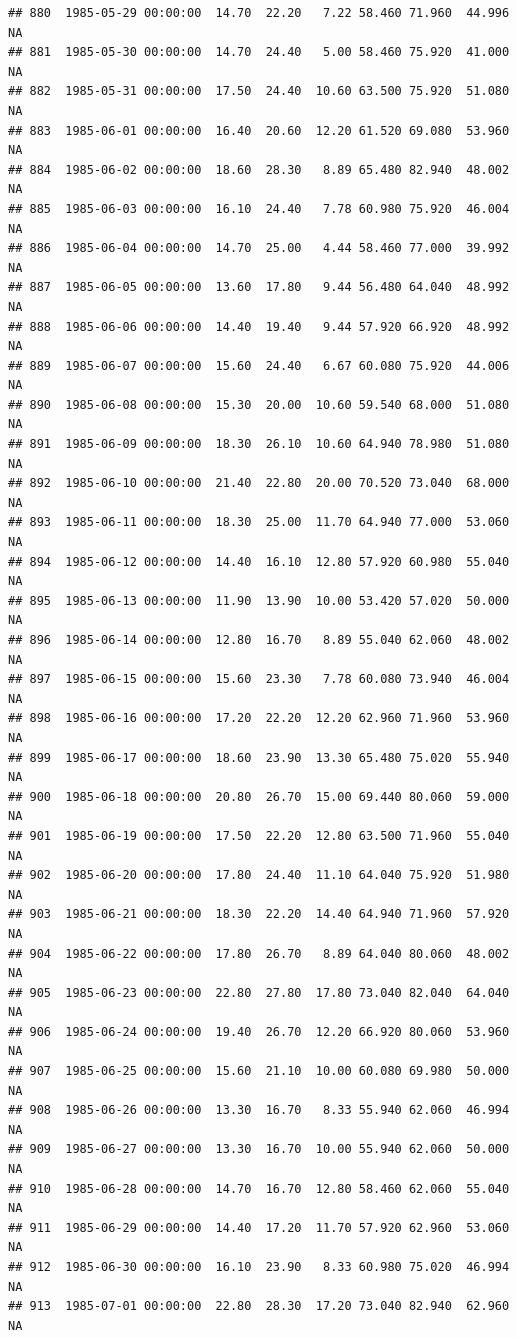 \documentclass{article}\usepackage{graphicx, color}
\makeatletter
\newenvironment{kframe}{%
 \def\at@end@of@kframe{}%
 \ifinner\ifhmode%
  \def\at@end@of@kframe{\end{minipage}}%
  \begin{minipage}{\columnwidth}%
 \fi\fi%
 \def\FrameCommand##1{\hskip\@totalleftmargin \hskip-\fboxsep
 \colorbox{shadecolor}{##1}\hskip-\fboxsep
     \hskip-\linewidth \hskip-\@totalleftmargin \hskip\columnwidth}%
 \MakeFramed {\advance\hsize-\width
   \@totalleftmargin\z@ \linewidth\hsize
   \@setminipage}}%
 {\par\unskip\endMakeFramed%
 \at@end@of@kframe}
\newenvironment{knitrout}{}{} %
\makeatother
\begin{document}
\begin{knitrout}
\begin{kframe}
\begin{verbatim}
## 880  1985-05-29 00:00:00  14.70  22.20   7.22 58.460 71.960  44.996     NA
## 881  1985-05-30 00:00:00  14.70  24.40   5.00 58.460 75.920  41.000     NA
## 882  1985-05-31 00:00:00  17.50  24.40  10.60 63.500 75.920  51.080     NA
## 883  1985-06-01 00:00:00  16.40  20.60  12.20 61.520 69.080  53.960     NA
## 884  1985-06-02 00:00:00  18.60  28.30   8.89 65.480 82.940  48.002     NA
## 885  1985-06-03 00:00:00  16.10  24.40   7.78 60.980 75.920  46.004     NA
## 886  1985-06-04 00:00:00  14.70  25.00   4.44 58.460 77.000  39.992     NA
## 887  1985-06-05 00:00:00  13.60  17.80   9.44 56.480 64.040  48.992     NA
## 888  1985-06-06 00:00:00  14.40  19.40   9.44 57.920 66.920  48.992     NA
## 889  1985-06-07 00:00:00  15.60  24.40   6.67 60.080 75.920  44.006     NA
## 890  1985-06-08 00:00:00  15.30  20.00  10.60 59.540 68.000  51.080     NA
## 891  1985-06-09 00:00:00  18.30  26.10  10.60 64.940 78.980  51.080     NA
## 892  1985-06-10 00:00:00  21.40  22.80  20.00 70.520 73.040  68.000     NA
## 893  1985-06-11 00:00:00  18.30  25.00  11.70 64.940 77.000  53.060     NA
## 894  1985-06-12 00:00:00  14.40  16.10  12.80 57.920 60.980  55.040     NA
## 895  1985-06-13 00:00:00  11.90  13.90  10.00 53.420 57.020  50.000     NA
## 896  1985-06-14 00:00:00  12.80  16.70   8.89 55.040 62.060  48.002     NA
## 897  1985-06-15 00:00:00  15.60  23.30   7.78 60.080 73.940  46.004     NA
## 898  1985-06-16 00:00:00  17.20  22.20  12.20 62.960 71.960  53.960     NA
## 899  1985-06-17 00:00:00  18.60  23.90  13.30 65.480 75.020  55.940     NA
## 900  1985-06-18 00:00:00  20.80  26.70  15.00 69.440 80.060  59.000     NA
## 901  1985-06-19 00:00:00  17.50  22.20  12.80 63.500 71.960  55.040     NA
## 902  1985-06-20 00:00:00  17.80  24.40  11.10 64.040 75.920  51.980     NA
## 903  1985-06-21 00:00:00  18.30  22.20  14.40 64.940 71.960  57.920     NA
## 904  1985-06-22 00:00:00  17.80  26.70   8.89 64.040 80.060  48.002     NA
## 905  1985-06-23 00:00:00  22.80  27.80  17.80 73.040 82.040  64.040     NA
## 906  1985-06-24 00:00:00  19.40  26.70  12.20 66.920 80.060  53.960     NA
## 907  1985-06-25 00:00:00  15.60  21.10  10.00 60.080 69.980  50.000     NA
## 908  1985-06-26 00:00:00  13.30  16.70   8.33 55.940 62.060  46.994     NA
## 909  1985-06-27 00:00:00  13.30  16.70  10.00 55.940 62.060  50.000     NA
## 910  1985-06-28 00:00:00  14.70  16.70  12.80 58.460 62.060  55.040     NA
## 911  1985-06-29 00:00:00  14.40  17.20  11.70 57.920 62.960  53.060     NA
## 912  1985-06-30 00:00:00  16.10  23.90   8.33 60.980 75.020  46.994     NA
## 913  1985-07-01 00:00:00  22.80  28.30  17.20 73.040 82.940  62.960     NA

\end{verbatim}
\end{kframe}
\end{knitrout}
\end{document}

